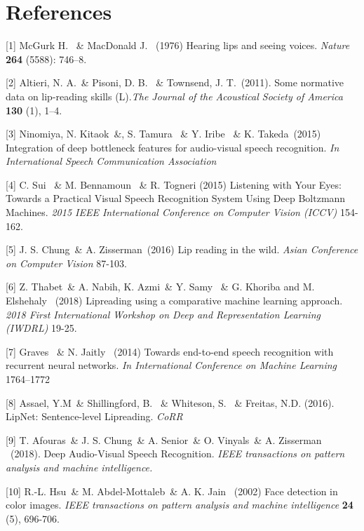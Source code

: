 \documentclass{article}
\begin{document}
\section*{References}
\small

[1] McGurk H. \ \& MacDonald J. \ (1976) Hearing lips and seeing voices. {\it Nature} {\bf 264} (5588): 746–8.

[2] Altieri, N. A.\ \& Pisoni, D. B. \ \& Townsend, J. T.\  (2011). Some normative data on lip-reading skills (L).{\it The Journal of the Acoustical Society of America}  {\bf 130} (1), 1–4.

[3]  Ninomiya, N. Kitaok\ \&, S. Tamura \ \& Y. Iribe \ \&  K. Takeda\ (2015) Integration of deep bottleneck features for audio-visual speech recognition. {\it In International Speech Communication Association}

[4] C. Sui \ \& M. Bennamoun \ \& R. Togneri (2015) Listening with Your Eyes: Towards a Practical Visual Speech Recognition System Using Deep Boltzmann Machines. {\it 2015 IEEE International Conference on Computer Vision (ICCV)} 154-162.

[5] J. S. Chung\ \& A. Zisserman\ (2016) Lip reading in the wild. {\it Asian Conference on Computer Vision} 87-103.

[6] Z. Thabet\ \& A. Nabih, K. Azmi\ \& Y. Samy \ \& G. Khoriba and M. Elshehaly \ (2018) Lipreading using a comparative machine learning approach. {\it 2018 First International Workshop on Deep and Representation Learning (IWDRL)} 19-25.

[7]  Graves \ \& N. Jaitly \ (2014) Towards end-to-end speech recognition with recurrent neural networks. {\it In International Conference on Machine Learning} 1764–1772

[8] Assael, Y.M\ \& Shillingford, B. \ \& Whiteson, S. \ \& Freitas, N.D. (2016). LipNet: Sentence-level Lipreading. {\it CoRR}

[9] T. Afouras\ \& J. S. Chung\ \& A. Senior\ \& O. Vinyals\ \& A. Zisserman \ (2018). Deep Audio-Visual Speech Recognition. {\it IEEE transactions on pattern analysis and machine intelligence.}

[10] R.-L. Hsu\ \& M. Abdel-Mottaleb\ \& A. K. Jain \ (2002) Face detection in color images. {\it IEEE transactions on pattern analysis and machine intelligence} {\bf 24} (5), 696-706.
\end{document}

